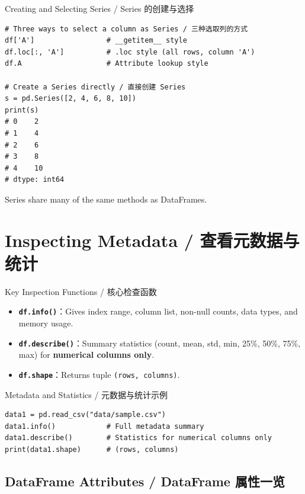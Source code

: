 \documentclass[11pt,a4paper]{report}
\let\oldtexttt\texttt
\renewcommand{\texttt}[1]{\textcolor{mainblue}{\oldtexttt{#1}}}
\begin{document}
\begin{examplebox}{Creating and Selecting Series / Series 的创建与选择}
\begin{lstlisting}
# Three ways to select a column as Series / 三种选取列的方式
df['A']                 # __getitem__ style
df.loc[:, 'A']          # .loc style (all rows, column 'A')
df.A                    # Attribute lookup style

# Create a Series directly / 直接创建 Series
s = pd.Series([2, 4, 6, 8, 10])
print(s)
# 0    2
# 1    4
# 2    6
# 3    8
# 4    10
# dtype: int64
\end{lstlisting}
    Series share many of the same methods as DataFrames.
\end{examplebox}

\section{Inspecting Metadata / 查看元数据与统计}

\begin{concept}{Key Inspection Functions / 核心检查函数}
    \begin{itemize}[itemsep=0.8em]
        \item \textbf{\texttt{df.info()}}：Gives index range, column list, non-null counts, data types, and memory usage.
        \item \textbf{\texttt{df.describe()}}：Summary statistics (count, mean, std, min, 25\%, 50\%, 75\%, max) for \textbf{numerical columns only}.
        \item \textbf{\texttt{df.shape}}：Returns tuple \texttt{(rows, columns)}.
    \end{itemize}
\end{concept}

\begin{examplebox}{Metadata and Statistics / 元数据与统计示例}
\begin{lstlisting}
data1 = pd.read_csv("data/sample.csv")
data1.info()            # Full metadata summary
data1.describe()        # Statistics for numerical columns only
print(data1.shape)      # (rows, columns)
\end{lstlisting}
\end{examplebox}

\subsection{DataFrame Attributes / DataFrame 属性一览}
\end{document}
